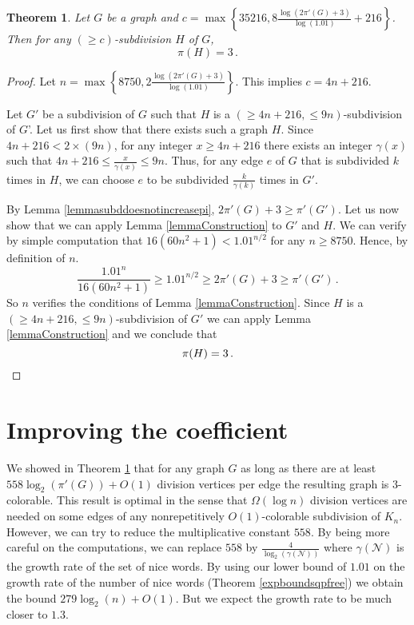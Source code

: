 \documentclass[a4paper,12pt]{article}
\newtheorem{theorem}{Theorem}
\begin{document}
\begin{theorem}\label{mainth}
  Let $G$ be a graph and $c= \max\left\{35216,8\frac{\log(2\pi'(G)+3)}{\log(1.01)}+216\right\}$.
  Then for any $(\ge c)$-subdivision $H$ of $G$, 
  $$\pi(H)=3\,.$$  
\end{theorem}
\begin{proof}
Let $n=\max\left\{8750,2\frac{\log(2\pi'(G)+3)}{\log(1.01)}\right\}$. This implies $c= 4n+216$.

Let $G'$ be a subdivision of $G$ such that $H$ is a $(\ge 4n+216, \le 9n)$-subdivision of $G$'.
Let us first show that there exists such a graph $H$.
Since $4n+216<2\times (9n)$, for any integer $x\ge4n+216$ there exists an integer $\gamma(x)$ such that
$4n+216\le\frac{x}{\gamma(x)}\le 9n$.
Thus, for any edge $e$ of $G$ that is subdivided $k$ times in $H$, we can choose $e$ to be subdivided $\frac{k}{\gamma(k)}$ times in $G'$.

By Lemma \ref{lemmasubddoesnotincreasepi},  $2\pi'(G)+3\ge \pi'(G')$.
Let us now show that we can apply Lemma \ref{lemmaConstruction} to $G'$ and $H$.
We can verify by simple computation that $16(60n^2+1)< 1.01^{n/2}$ for any $n\ge8750$.
Hence, by definition of $n$.
$$\frac{1.01^{n}}{16(60n^2+1)}\ge1.01^{n/2} \ge 2\pi'(G)+3\ge \pi'(G')\,.$$
So $n$ verifies the conditions of Lemma \ref{lemmaConstruction}. Since $H$ is a 
$(\ge 4n+216, \le 9n)$-subdivision of $G'$ we can apply Lemma \ref{lemmaConstruction} and we  conclude that 
$$\pi(H)=3\,.\qedhere$$
\end{proof}

\section{Improving the coefficient}
We showed in Theorem \ref{mainth} that for any graph $G$ as long as there are at least $558 \log_2(\pi'(G))+ O(1)$ division vertices per edge the resulting graph is $3$-colorable.
This result is optimal in the sense that $\Omega(\log n)$ division vertices are needed  on some edges of any nonrepetitively $O(1)$-colorable subdivision of $K_n$\cite{nesetrilsubdivision}.
However, we can try to reduce the multiplicative constant $558$.
By being more careful on the computations, we can replace $558$ by 
$\frac{4}{\log_2(\gamma(\mathcal{N}))}$ where $\gamma(\mathcal{N})$ is the growth rate of the set of nice words. By using our lower bound of $1.01$ on the growth rate of the number of nice words (Theorem \ref{expboundsqpfree}) we obtain the bound $279\log_2(n)+ O(1)$. But we expect the growth rate to be much closer to $1.3$.
\end{document}
